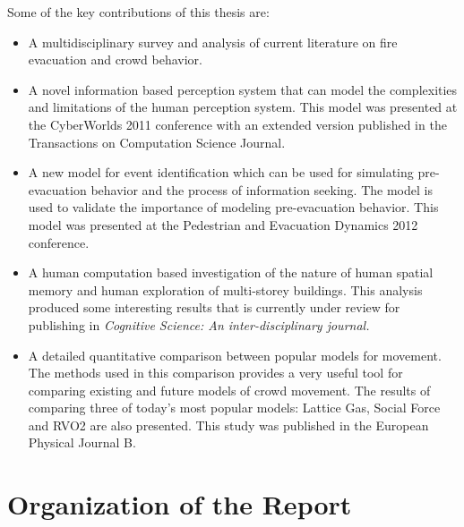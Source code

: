 Some of the key contributions of this thesis are:
\begin{itemize}
	\item A multidisciplinary survey and analysis of current literature on fire evacuation and crowd behavior.


	\item A novel information based perception system that can model the complexities and limitations of the human perception system. This model was presented at the CyberWorlds 2011 conference with an extended version published in the Transactions on Computation Science Journal.

	\item A new model for event identification which can be used for simulating pre-evacuation behavior and the process of information seeking. The model is used to validate the importance of modeling pre-evacuation behavior. This model was presented at the Pedestrian and Evacuation Dynamics 2012 conference.

	\item A human computation based investigation of the nature of human spatial memory and human exploration of multi-storey buildings. This analysis produced some interesting results that is currently under review for publishing in \emph{Cognitive Science: An inter-disciplinary journal.
    }

    \item A detailed quantitative comparison between popular models for movement. The methods used in this comparison provides a very useful tool for comparing existing and future models of crowd movement. The results of comparing three of today's most popular models: Lattice Gas, Social Force and RVO2 are also presented. This study was published in the European Physical Journal B.



\end{itemize}


\section{Organization of the Report}
\label{Intro:Organisation}

